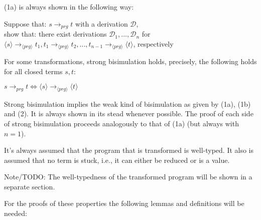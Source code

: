 \documentclass[11pt]{article} %
\begin{document}
(1a) is always shown in the following way:

Suppose that: $s \longrightarrow_{prg} t$ with a derivation $\mathcal{D}$, \\
show that: there exist derivations $\mathcal{D}_1, ..., \mathcal{D}_n$ for $\langle s \rangle \longrightarrow_{\langle prg \rangle} t_1, t_1 \longrightarrow_{\langle prg \rangle} t_2, ..., t_{n-1} \longrightarrow_{\langle prg \rangle} \langle t \rangle$, respectively

For some transformations, strong bisimulation holds, precisely, the following holds for all closed terms $s, t$:

$ s \longrightarrow_{prg} t \iff \langle s \rangle \longrightarrow_{\langle prg \rangle} \langle t \rangle$

Strong bisimulation implies the weak kind of bisimulation as given by (1a), (1b) and (2). It is always shown in its stead whenever possible. The proof of each side of strong bisimulation proceeds analogously to that of (1a) (but always with $n = 1$).

It's always assumed that the program that is transformed is well-typed. It also is assumed that no term is stuck, i.e., it can either be reduced or is a value.

Note/TODO: The well-typedness of the transformed program will be shown in a separate section.

For the proofs of these properties the following lemmas and definitions will be needed:
\end{document}
